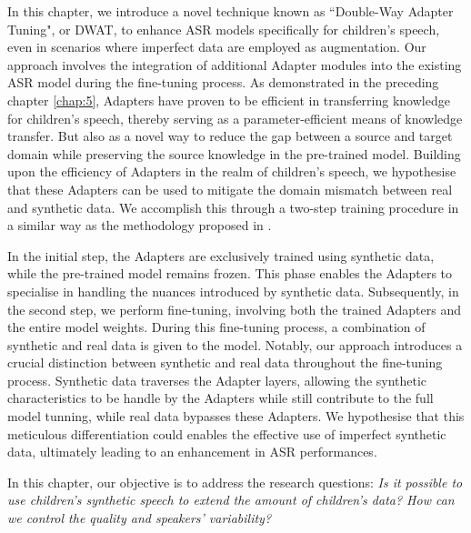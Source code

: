 In this chapter, we introduce a novel technique known as ``Double-Way Adapter Tuning", or \ac{DWAT}, to enhance \ac{ASR} models specifically for children's speech, even in scenarios where imperfect data are employed as augmentation. Our approach involves the integration of additional Adapter modules into the existing \ac{ASR} model during the fine-tuning process. As demonstrated in the preceding chapter \ref{chap:5}, Adapters have proven to be efficient in transferring knowledge for children's speech, thereby serving as a parameter-efficient means of knowledge transfer. But also as a novel way to reduce the gap between a source and target domain while preserving the source knowledge in the pre-trained model.
Building upon the efficiency of Adapters in the realm of children's speech, we hypothesise that these Adapters can be used to mitigate the domain mismatch between real and synthetic data. We accomplish this through a two-step training procedure in a similar way as the methodology proposed in \cite{fan2022draft}.

In the initial step, the Adapters are exclusively trained using synthetic data, while the pre-trained model remains frozen. This phase enables the Adapters to specialise in handling the nuances introduced by synthetic data. Subsequently, in the second step, we perform fine-tuning, involving both the trained Adapters and the entire model weights. During this fine-tuning process, a combination of synthetic and real data is given to the model. Notably, our approach introduces a crucial distinction between synthetic and real data throughout the fine-tuning process. Synthetic data traverses the Adapter layers, allowing the synthetic characteristics to be handle by the Adapters while  still contribute to the full model tunning, while real data bypasses these Adapters. We hypothesise that this meticulous differentiation could enables the effective use of imperfect synthetic data, ultimately leading to an enhancement in \ac{ASR} performances.

In this chapter, our objective is to address the research questions: \textit{Is it possible to use children's synthetic speech to extend the amount of children's data? How can we control the quality and speakers’ variability?}

